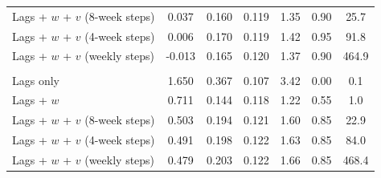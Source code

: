 \begin{tabular}{@{}lcccccc@{}}
\quad Lags + $w$ + $v$ (8-week steps) & 0.037 & 0.160 & 0.119 & 1.35 & 0.90 & 25.7 \\
\quad Lags + $w$ + $v$ (4-week steps) & 0.006 & 0.170 & 0.119 & 1.42 & 0.95 & 91.8 \\
\quad Lags + $w$ + $v$ (weekly steps) & -0.013 & 0.165 & 0.120 & 1.37 & 0.90 & 464.9 \\
\addlinespace
\multicolumn{7}{@{}l}{\emph{Mixed, slow $v$ ($\delta = 0.5$, $\phi = 0.97$ per week)}} \\
\quad Lags only & 1.650 & 0.367 & 0.107 & 3.42 & 0.00 & 0.1 \\
\quad Lags + $w$ & 0.711 & 0.144 & 0.118 & 1.22 & 0.55 & 1.0 \\
\quad Lags + $w$ + $v$ (8-week steps) & 0.503 & 0.194 & 0.121 & 1.60 & 0.85 & 22.9 \\
\quad Lags + $w$ + $v$ (4-week steps) & 0.491 & 0.198 & 0.122 & 1.63 & 0.85 & 84.0 \\
\quad Lags + $w$ + $v$ (weekly steps) & 0.479 & 0.203 & 0.122 & 1.66 & 0.85 & 468.4 \\
\bottomrule
\end{tabular}
